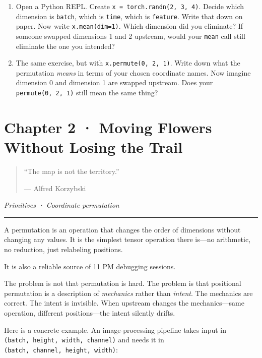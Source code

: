 \documentclass[11pt,]{article}
\begin{document}
\begin{enumerate}
\def\labelenumi{\arabic{enumi}.}
\item
  Open a Python REPL. Create \texttt{x\ =\ torch.randn(2,\ 3,\ 4)}.
  Decide which dimension is \texttt{batch}, which is \texttt{time},
  which is \texttt{feature}. Write that down on paper. Now write
  \texttt{x.mean(dim=1)}. Which dimension did you eliminate? If someone
  swapped dimensions 1 and 2 upstream, would your \texttt{mean} call
  still eliminate the one you intended?
\item
  The same exercise, but with \texttt{x.permute(0,\ 2,\ 1)}. Write down
  what the permutation \emph{means} in terms of your chosen coordinate
  names. Now imagine dimension 0 and dimension 1 are swapped upstream.
  Does your \texttt{permute(0,\ 2,\ 1)} still mean the same thing?
\end{enumerate}

\newpage

\hypertarget{chapter-2-moving-flowers-without-losing-the-trail}{%
\section{Chapter 2 · Moving Flowers Without Losing the
Trail}\label{chapter-2-moving-flowers-without-losing-the-trail}}

\begin{quote}
``The map is not the territory.''

--- Alfred Korzybski
\end{quote}

\emph{Primitives · Coordinate permutation}

\begin{center}\rule{0.5\linewidth}{0.4pt}\end{center}

A permutation is an operation that changes the order of dimensions
without changing any values. It is the simplest tensor operation there
is---no arithmetic, no reduction, just relabeling positions.

It is also a reliable source of 11 PM debugging sessions.

The problem is not that permutation is hard. The problem is that
positional permutation is a description of \emph{mechanics} rather than
\emph{intent}. The mechanics are correct. The intent is invisible. When
upstream changes the mechanics---same operation, different
positions---the intent silently drifts.

Here is a concrete example. An image-processing pipeline takes input in
\texttt{(batch,\ height,\ width,\ channel)} and needs it in
\texttt{(batch,\ channel,\ height,\ width)}:
\end{document}
